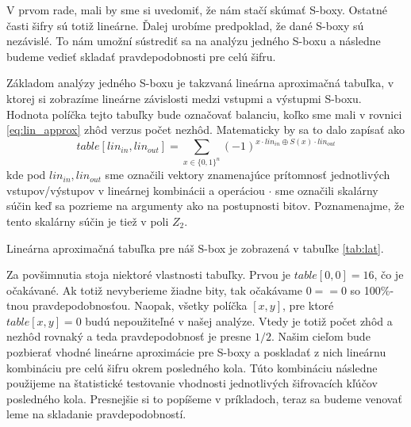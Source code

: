 V prvom rade, mali by sme si
uvedomiť, že nám stačí skúmať S-boxy. Ostatné časti šifry sú totiž
lineárne. Ďalej urobíme predpoklad, že dané S-boxy sú nezávislé. To
nám umožní sústrediť sa na analýzu jedného S-boxu a následne budeme
vedieť skladať pravdepodobnosti pre celú šifru.

Základom analýzy jedného S-boxu je takzvaná lineárna aproximačná
tabuľka, v ktorej si zobrazíme lineárne závislosti medzi vstupmi a
výstupmi S-boxu.
Hodnota políčka tejto tabuľky bude označovať balanciu,
koľko sme mali v rovnici \ref{eq:lin_approx} zhôd verzus počet nezhôd.
Matematicky by sa to dalo zapísať ako
\begin{equation*}
    table[lin_{in},lin_{out}] = \sum_{x \in \{0,1\}^n} (-1)^{
        x \cdot lin_{in} \oplus S(x) \cdot lin_{out}}
\end{equation*}
kde pod $lin_{in},lin_{out}$ sme označili vektory znamenajúce
prítomnosť jednotlivých vstupov/výstupov v lineárnej kombinácii
a operáciou $\cdot$ sme označili skalárny súčin keď sa pozrieme na
argumenty ako na postupnosti bitov. Poznamenajme, že tento skalárny
súčin je tiež v poli $Z_2$.

Lineárna aproximačná tabuľka pre náš S-box je zobrazená v tabuľke
\ref{tab:lat}.


Za povšimnutia stoja niektoré vlastnosti tabuľky. Prvou je
$table[0,0] = 16$, čo je očakávané. Ak totiž nevyberieme žiadne bity,
tak očakávame $0==0$ so 100\%-tnou pravdepodobnosťou.
Naopak, všetky políčka $[x,y]$, pre ktoré $table[x,y]=0$ budú
nepoužiteľné v našej analýze. Vtedy je totiž počet zhôd a nezhôd
rovnaký a teda pravdepodobnosť je presne $1/2$. Našim cieľom bude
pozbierať vhodné lineárne aproximácie pre S-boxy a poskladať z nich
lineárnu kombináciu pre celú šifru okrem posledného kola.
Túto kombináciu následne použijeme na štatistické testovanie
vhodnosti jednotlivých šifrovacích kľúčov posledného kola. Presnejšie
si to popíšeme v príkladoch, teraz sa budeme venovať leme na skladanie
pravdepodobností.

\begin{lema}
\end{lema}


